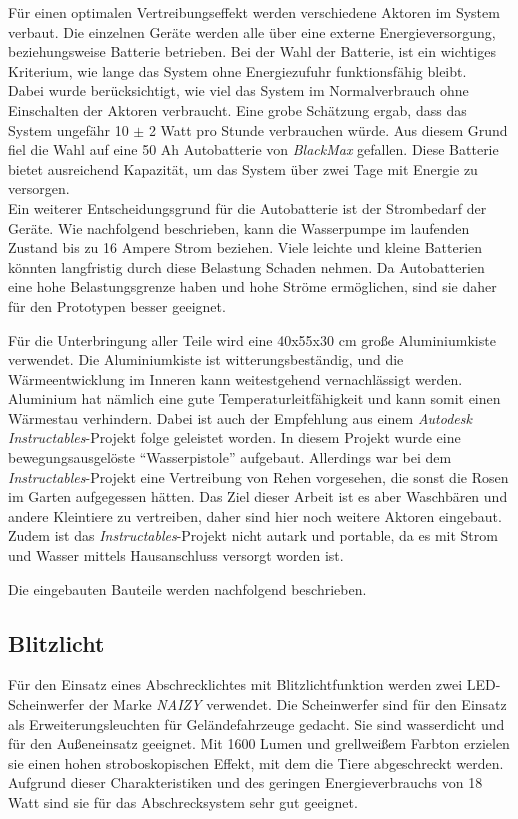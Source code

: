 Für einen optimalen Vertreibungseffekt werden verschiedene Aktoren im System verbaut. Die einzelnen Geräte werden alle über eine externe Energieversorgung, beziehungsweise Batterie betrieben. Bei der Wahl der Batterie, ist ein wichtiges Kriterium, wie lange das System ohne Energiezufuhr funktionsfähig bleibt.
\\
Dabei wurde berücksichtigt, wie viel das System im Normalverbrauch ohne Einschalten der Aktoren verbraucht. Eine grobe Schätzung ergab, dass das System ungefähr 10 $\pm$ 2 Watt pro Stunde verbrauchen würde. Aus diesem Grund fiel die Wahl auf eine 50 Ah Autobatterie von \textit{BlackMax} \cite{Autobatterie} gefallen. Diese Batterie bietet ausreichend Kapazität, um das System über zwei Tage mit Energie zu versorgen.
\\
Ein weiterer Entscheidungsgrund für die Autobatterie ist der Strombedarf der Geräte. Wie nachfolgend beschrieben, kann die Wasserpumpe im laufenden Zustand bis zu 16 Ampere Strom beziehen. Viele leichte und kleine Batterien könnten langfristig durch diese Belastung Schaden nehmen. Da Autobatterien eine hohe Belastungsgrenze haben und hohe Ströme ermöglichen, sind sie daher für den Prototypen besser geeignet.

Für die Unterbringung aller Teile wird eine 40x55x30 cm große Aluminiumkiste verwendet. Die Aluminiumkiste ist witterungsbeständig, und die Wärmeentwicklung im Inneren kann weitestgehend vernachlässigt werden. Aluminium hat nämlich eine gute Temperaturleitfähigkeit und kann somit einen Wärmestau verhindern. Dabei ist auch der Empfehlung aus einem \textit{Autodesk Instructables}-Projekt folge geleistet worden. In diesem Projekt wurde eine bewegungsausgelöste "`Wasserpistole"' aufgebaut. Allerdings war bei dem \textit{Instructables}-Projekt eine Vertreibung von Rehen vorgesehen, die sonst die Rosen im Garten aufgegessen hätten. Das Ziel dieser Arbeit ist es aber Waschbären und andere Kleintiere zu vertreiben, daher sind hier noch weitere Aktoren eingebaut. Zudem ist das \textit{Instructables}-Projekt nicht autark und portable, da es mit Strom und Wasser mittels Hausanschluss versorgt worden ist. \cite{watergun_dude}

Die eingebauten Bauteile werden nachfolgend beschrieben.

\subsection{Blitzlicht}

Für den Einsatz eines Abschrecklichtes mit Blitzlichtfunktion werden zwei LED-Scheinwerfer der Marke \textit{NAIZY} verwendet. Die Scheinwerfer sind für den Einsatz als Erweiterungsleuchten für Geländefahrzeuge gedacht. Sie sind wasserdicht und für den Außeneinsatz geeignet. Mit 1600 Lumen und grellweißem Farbton erzielen sie einen hohen stroboskopischen Effekt, mit dem die Tiere abgeschreckt werden. Aufgrund dieser Charakteristiken und des geringen Energieverbrauchs von 18 Watt sind sie für das Abschrecksystem sehr gut geeignet. \cite{am_licht}

